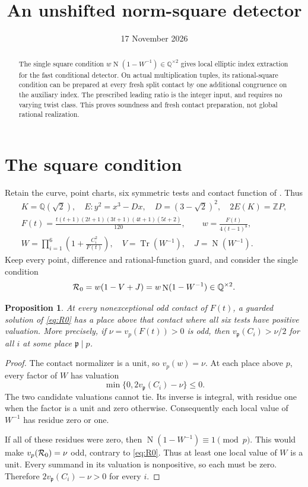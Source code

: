 \documentclass[11pt,a4paper]{article}
\title{An unshifted norm-square detector}
\author{}\date{17 November 2026}
\newtheorem{proposition}{Proposition}[section]
\newcommand{\Q}{\mathbb Q}\newcommand{\Z}{\mathbb Z}
\DeclareMathOperator{\Tr}{Tr}\DeclareMathOperator{\Nm}{N}
\begin{document}
\maketitle
\begin{abstract}
The single square condition $w\Nm(1-W^{-1})\in\Q^{\times2}$ gives
local elliptic index extraction for the fast conditional detector.
On actual multiplication tuples, its rational-square condition can be
prepared at every fresh split contact by one additional congruence on
the auxiliary index. The prescribed leading ratio is the integer input,
and requires no varying twist class. This proves soundness and fresh
contact preparation, not global rational realization.
\end{abstract}

\section{The square condition}

Retain the curve, point charts, six symmetric tests and contact function
of \cite{Single}. Thus
\[
 \begin{gathered}
 K=\Q(\sqrt2),\quad E:y^2=x^3-Dx,\quad D=(3-\sqrt2)^2,
 \quad 2E(K)=\Z P,\\
 F(t)=\frac{t(t+1)(2t+1)(3t+1)(4t+1)(5t+2)}{120},
 \qquad w=\frac{F(t)}{4(t-1)^8},\\
 W=\prod_{i=1}^6\left(1+\frac{C_i^2}{F(t)}\right),
 \quad V=\Tr(W^{-1}),\quad J=\Nm(W^{-1}).
 \end{gathered}
\]
Keep every point, difference and rational-function guard, and consider
the single condition
\begin{equation}\label{eq:R0}
                 {\cal R}_0=w(1-V+J)
                    =w\Nm(1-W^{-1})\in\Q^{\times2}.
\end{equation}

\begin{proposition}\label{prop:extract}
At every nonexceptional odd contact of $F(t)$, a guarded solution of
\eqref{eq:R0} has a place above that contact where all six tests
have positive valuation. More precisely, if
$\nu=v_p(F(t))>0$ is odd, then
$v_{\mathfrak p}(C_i)>\nu/2$ for all $i$ at some place
$\mathfrak p\mid p$.
\end{proposition}
\begin{proof}
The contact normalizer is a unit, so $v_p(w)=\nu$.
At each place above $p$, every factor of $W$ has valuation
\[
        \min\{0,2v_{\mathfrak p}(C_i)-\nu\}\le0.
\]
The two candidate valuations cannot tie. Its inverse is integral,
with residue one when the factor is a unit and zero otherwise.
Consequently each local value of $W^{-1}$ has residue zero or one.

If all of these residues were zero, then
$\Nm(1-W^{-1})\equiv1\pmod p$. This would make
$v_p({\cal R}_0)=\nu$ odd, contrary to \eqref{eq:R0}.
Thus at least one local value of $W$ is a unit. Every summand in
its valuation is nonpositive, so each must be zero. Therefore
$2v_{\mathfrak p}(C_i)-\nu>0$ for every $i$.
\end{proof}
\end{document}
